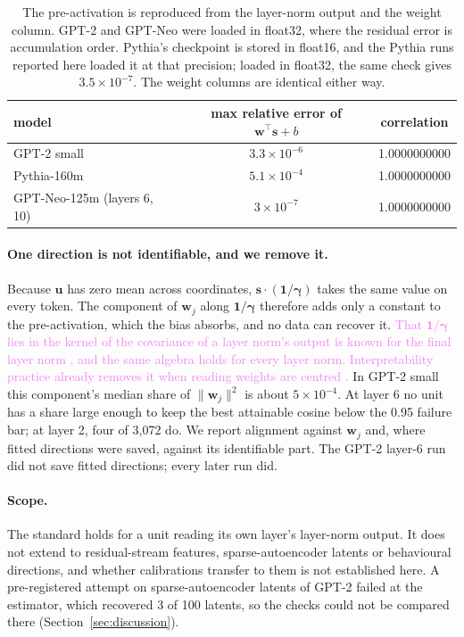 \documentclass[10pt]{article}
\newcommand{\draft}[1]{\textcolor{violet}{#1}}
\begin{document}
\begin{table}[t]
\centering
\begin{tabular}{lcc}
\toprule
model & max relative error of $\mathbf{w}^\top\mathbf{s}+b$ & correlation \\
\midrule
GPT-2 small & $3.3\times10^{-6}$ & 1.0000000000 \\
Pythia-160m & $5.1\times10^{-4}$ & 1.0000000000 \\
GPT-Neo-125m (layers 6, 10) & $3\times10^{-7}$ & 1.0000000000 \\
\bottomrule
\end{tabular}
\caption{The pre-activation is reproduced from the layer-norm output and the weight column.
GPT-2 and GPT-Neo were loaded in float32, where the residual error is accumulation order.
Pythia's checkpoint is stored in float16, and the Pythia runs reported here loaded it at
that precision; loaded in float32, the same check gives $3.5\times10^{-7}$. The weight columns
are identical either way.}
\label{tab:verify}
\end{table}

\paragraph{One direction is not identifiable, and we remove it.} Because $\mathbf{u}$ has zero
mean across coordinates, $\mathbf{s}\cdot(\boldsymbol{1}/\boldsymbol{\gamma})$ takes the same
value on every token. The component of $\mathbf{w}_j$ along $\boldsymbol{1}/\boldsymbol{\gamma}$
therefore adds only a constant to the pre-activation, which the bias absorbs, and no data can
recover it. \draft{That $\boldsymbol{1}/\boldsymbol{\gamma}$ lies in the kernel of the
covariance of a layer norm's output is known for the final layer norm \citep{shirodkar2026dead},
and the same algebra holds for every layer norm. Interpretability practice already removes it
when reading weights are centred \citep{nanda2022transformerlens,gurnee2024universal}.} In GPT-2
small this component's median share of $\|\mathbf{w}_j\|^2$ is about $5\times10^{-4}$. At layer 6
no unit has a share large enough to keep the best attainable cosine below the 0.95 failure bar;
at layer 2, four of 3{,}072 do. We report alignment
against $\mathbf{w}_j$ and, where fitted directions were saved, against its identifiable
part. The GPT-2 layer-6 run did not save fitted directions; every later run did.

\paragraph{Scope.} The standard holds for a unit reading its own layer's layer-norm output.
It does not extend to residual-stream features, sparse-autoencoder latents or behavioural
directions, and whether calibrations transfer to them is not established here. A
pre-registered attempt on sparse-autoencoder latents of GPT-2 failed at the estimator, which
recovered 3 of 100 latents, so the checks could not be compared there
(Section~\ref{sec:discussion}).
\end{document}
